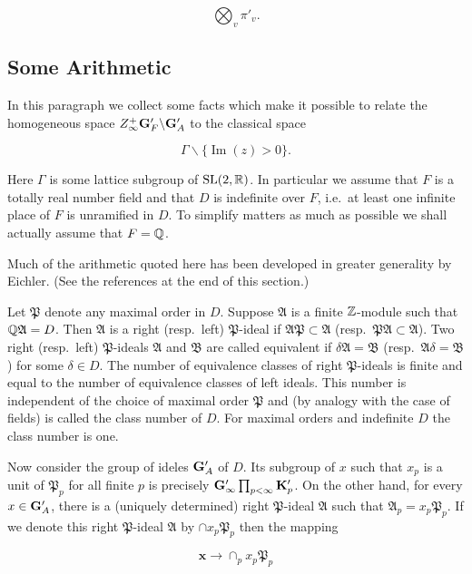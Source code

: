 \[
\bigotimes_v \pi'_v.
\]

\subsection*{Some Arithmetic}

In this paragraph we collect some facts which make it possible to relate the homogeneous space $Z_\infty^+ \mathbf{G}'_F \backslash \mathbf{G}'_A$ to the classical space

\[
\Gamma \backslash \{\operatorname{Im}(z) > 0\}.
\]

Here $\Gamma$ is some lattice subgroup of $\operatorname{SL}(2, \mathbb{R})$. In particular we assume that $F$ is a totally real number field and that $D$ is indefinite over $F$, i.e.\ at least one infinite place of $F$ is unramified in $D$. To simplify matters as much as possible we shall actually assume that $F = \mathbb{Q}$.

Much of the arithmetic quoted here has been developed in greater generality by Eichler. (See the references at the end of this section.)

Let $\mathfrak{P}$ denote any maximal order in $D$. Suppose $\mathfrak{A}$ is a finite $\mathbb{Z}$-module such that $\mathbb{Q}\mathfrak{A} = D$. Then $\mathfrak{A}$ is a right (resp.\ left) $\mathfrak{P}$-ideal if $\mathfrak{A}\mathfrak{P} \subset \mathfrak{A}$ (resp.\ $\mathfrak{P}\mathfrak{A} \subset \mathfrak{A}$). Two right (resp.\ left) $\mathfrak{P}$-ideals $\mathfrak{A}$ and $\mathfrak{B}$ are called equivalent if $\delta\mathfrak{A} = \mathfrak{B}$ (resp.\ $\mathfrak{A}\delta = \mathfrak{B}$) for some $\delta \in D$. The number of equivalence classes of right $\mathfrak{P}$-ideals is finite and equal to the number of equivalence classes of left ideals. This number is independent of the choice of maximal order $\mathfrak{P}$ and (by analogy with the case of fields) is called the class number of $D$. For maximal orders and indefinite $D$ the class number is one.

Now consider the group of ideles $\mathbf{G}'_A$ of $D$. Its subgroup of $x$ such that $x_p$ is a unit of $\mathfrak{P}_p$ for all finite $p$ is precisely $\mathbf{G}'_\infty \prod_{p < \infty} \mathbf{K}'_p$. On the other hand, for every $x \in \mathbf{G}'_A$, there is a (uniquely determined) right $\mathfrak{P}$-ideal $\mathfrak{A}$ such that $\mathfrak{A}_p = x_p\mathfrak{P}_p$. If we denote this right $\mathfrak{P}$-ideal $\mathfrak{A}$ by $\cap x_p\mathfrak{P}_p$ then the mapping

\[
\mathbf{x} \to \cap_p x_p\mathfrak{P}_p
\]

